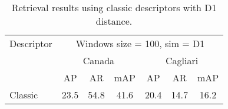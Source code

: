 \documentclass[12pt,italian]{article}
\begin{document}


\begin{table}
	\centering
	\caption{Retrieval results using classic descriptors with D1 distance.}
	\label{tab:retrievalD1}
	\begin{tabular}{lcccccc}
		\toprule
		Descriptor &     \multicolumn{6}{c}{Windows size = 100, sim = D1}      \\
		           & \multicolumn{3}{c}{Canada} & \multicolumn{3}{c}{Cagliari} \\
		           &  AP  &  AR  &     mAP      &  AP  &  AR  &      mAP       \\ \midrule
		Classic    & 23.5 & 54.8 &     41.6     & 20.4 & 14.7 &      16.2      \\ \bottomrule
	\end{tabular}
\end{table}

 \pagebreak 
\end{document}

